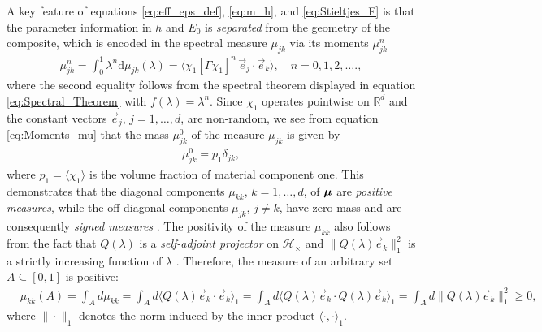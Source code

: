 \documentclass{cmslatex}
\renewcommand{\d}{\text{d}}
\newcommand\bmu{\mbox{\boldmath${\mu}$}}
\begin{document}
A key feature of equations \eqref{eq:eff_eps_def}, \eqref{eq:m_h}, and
\eqref{eq:Stieltjes_F} is that the parameter information in $h$ and
$E_0$ is \emph{separated} from the geometry of the composite, which is
encoded in the spectral measure $\mu_{jk}$ via its moments $\mu_{jk}^n$
\cite{Golden:CMP-473,Bruno:JSP-365}
%
\begin{align}\label{eq:Moments_mu}
  \mu_{jk}^n=\int_0^1\lambda^n\d\mu_{jk}(\lambda)       
       =\langle\chi_1[\Gamma \chi_1]^n\,\vec{e}_j\cdot\vec{e}_k\rangle,
  \quad n=0,1,2,\ldots.,
\end{align}
%
where the second equality follows from the spectral theorem displayed
in equation \eqref{eq:Spectral_Theorem} with $f(\lambda)=\lambda^n$. Since $\chi_1$
operates pointwise on $\mathbb{R}^d$ and the constant vectors
$\vec{e}_j$, $j=1,\ldots,d$, are non-random, we see from equation
\eqref{eq:Moments_mu} that the mass $\mu_{jk}^0$ of the measure
$\mu_{jk}$ is given by
%
\begin{align}
  \mu_{jk}^0=p_1\delta_{jk},
\end{align}
%
where $p_1=\langle\chi_1\rangle$ is the volume fraction of material component
one. This demonstrates that the diagonal components $\mu_{kk}$,
$k=1,\ldots,d$, of $\bmu$ are \emph{positive measures}, 
while the off-diagonal components $\mu_{jk}$, $j\neq k$, have 
zero mass and are consequently \emph{signed measures}
\cite{Folland:99,Rudin:87}. The positivity of the measure $\mu_{kk}$ also
follows from the fact that $Q(\lambda)$ is a \emph{self-adjoint projector}
on $\mathscr{H}_\times$ and $\|Q(\lambda)\vec{e}_k\|_1^2$ is a strictly increasing
function of $\lambda$ \cite{Reed-1980,Stone:64}. Therefore, the measure of
an arbitrary set $A\subseteq[0,1]$ is positive:
% 
\begin{align}\label{eq:Mass_Sign_Measures}   
   &\mu_{kk}(A)=\int_Ad\mu_{kk}=\int_Ad\langle Q(\lambda)\vec{e}_k\cdot\vec{e}_k\rangle_1
       =\int_Ad\langle Q(\lambda)\vec{e}_k\cdot Q(\lambda)\vec{e}_k\rangle_1
       =\int_Ad\|Q(\lambda)\vec{e}_k\|_1^2\geq0,
\end{align}
%
where $\|\cdot\|_1$ denotes the norm induced by the inner-product
$\langle\cdot,\cdot\rangle_1$. 
\end{document}
